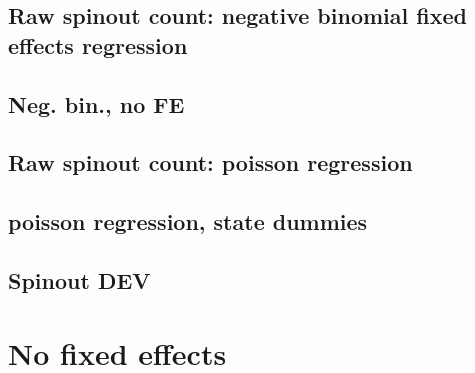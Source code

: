 \documentclass[12pt,english]{article}
\theoremstyle{remark}
\begin{document}

\linebreak

\subsection{Raw spinout count: negative binomial fixed effects regression}


\linebreak

\subsection{Neg. bin., no FE}


\linebreak

\subsection{Raw spinout count: poisson regression}


\linebreak

\subsection{poisson regression, state dummies}


\linebreak

\subsection{Spinout DEV}


\linebreak


\section{No fixed effects}
\end{document}

